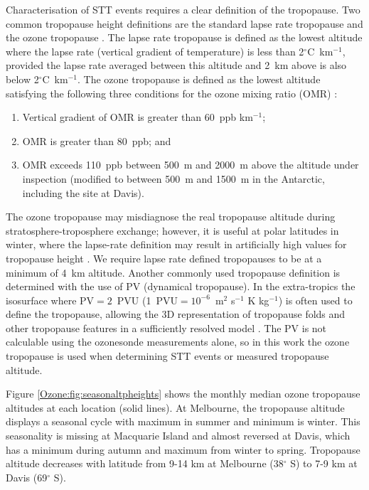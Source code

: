     Characterisation of STT events requires a clear definition of the tropopause.
    Two common tropopause height definitions are the standard lapse rate tropopause \parencite{WMO1957} and the ozone tropopause \parencite{Bethan1996}.
    The lapse rate tropopause is defined as the lowest altitude where the lapse rate (vertical gradient of temperature) is less than 2$^\circ$C~km$^{-1}$, provided the lapse rate averaged between this altitude and 2~km above is also below 2$^\circ$C~km$^{-1}$.
    The ozone tropopause is defined as the lowest altitude satisfying the following three conditions for the ozone mixing ratio (OMR) \parencite{Bethan1996}:
    \begin{enumerate}
      \item Vertical gradient of OMR is greater than 60~ppb km$^{-1}$;
      \item OMR is greater than 80~ppb; and
      \item OMR exceeds 110~ppb between 500~m and 2000~m above the altitude under inspection (modified to between 500~m and 1500~m in the Antarctic, including the site at Davis).
    \end{enumerate}
    The ozone tropopause may misdiagnose the real tropopause altitude during stratosphere-troposphere exchange; however, it is useful at polar latitudes in winter, where the lapse-rate definition may result in artificially high values for tropopause height \parencite{Bethan1996, Tomikawa2009, Alexander2013}.
    We require lapse rate defined tropopauses to be at a minimum of 4~km altitude. %
    Another commonly used tropopause definition is determined with the use of PV (dynamical tropopause).
    In the extra-tropics the isosurface where PV$=2$~PVU (1~PVU$= 10^{-6}$~m$^2$ s$^{-1}$ K kg$^{-1}$) is often used to define the tropopause, allowing the 3D representation of tropopause folds and other tropopause features in a sufficiently resolved model \parencite{Skerlak2014,Tyrlis2014}.
    The PV is not calculable using the ozonesonde measurements alone, so in this work the ozone tropopause is used when determining STT events or measured tropopause altitude.
    
    Figure \ref{Ozone:fig:seasonaltpheights} shows the monthly median ozone tropopause altitudes at each location (solid lines).
    At Melbourne, the tropopause altitude displays a seasonal cycle with maximum in summer and minimum is winter.
    This seasonality is missing at Macquarie Island and almost reversed at Davis, which has a minimum during autumn and maximum from winter to spring.
    Tropopause altitude decreases with latitude from 9-14 km at Melbourne (38$^\circ$ S) to 7-9 km at Davis (69$^\circ$ S).
    
